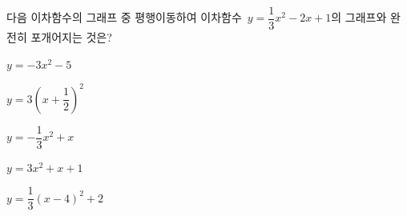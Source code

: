 다음 이차함수의 그래프 중 평행이동하여 이차함수~$y=\dfrac{1}{3}x^2-2x+1$의 그래프와 완전히 포개어지는 것은?
\begin{choicesii}{\rule[-3ex]{0pt}{8ex}$y=-3x^2-5$}{\rule[-3ex]{0pt}{8ex}$y=3\left(x+\dfrac{1}{2}\right)^2$}{\rule[-3ex]{0pt}{8ex}$y=-\dfrac{1}{3}x^2+x$}{\rule[-3ex]{0pt}{8ex}$y=3x^2+x+1$}{\rule[-3ex]{0pt}{8ex}$y=\dfrac{1}{3}(x-4)^2+2$}\end{choicesii}
